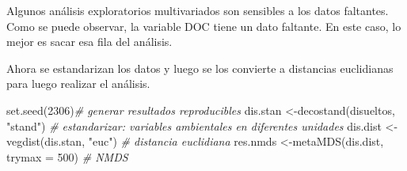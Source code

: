\documentclass[
]{book}
\newenvironment{Shaded}{\begin{snugshade}}{\end{snugshade}}
\newcommand{\AttributeTok}[1]{\textcolor[rgb]{0.77,0.63,0.00}{#1}}
\newcommand{\CommentTok}[1]{\textcolor[rgb]{0.56,0.35,0.01}{\textit{#1}}}
\newcommand{\DecValTok}[1]{\textcolor[rgb]{0.00,0.00,0.81}{#1}}
\newcommand{\DocumentationTok}[1]{\textcolor[rgb]{0.56,0.35,0.01}{\textbf{\textit{#1}}}}
\newcommand{\FunctionTok}[1]{\textcolor[rgb]{0.00,0.00,0.00}{#1}}
\newcommand{\NormalTok}[1]{#1}
\newcommand{\OtherTok}[1]{\textcolor[rgb]{0.56,0.35,0.01}{#1}}
\newcommand{\SpecialCharTok}[1]{\textcolor[rgb]{0.00,0.00,0.00}{#1}}
\newcommand{\StringTok}[1]{\textcolor[rgb]{0.31,0.60,0.02}{#1}}
\begin{document}
Algunos análisis exploratorios multivariados son sensibles a los datos faltantes. Como se puede observar, la variable DOC tiene un dato faltante. En este caso, lo mejor es sacar esa fila del análisis.

\begin{Shaded}
\end{Shaded}

Ahora se estandarizan los datos y luego se los convierte a distancias euclidianas para luego realizar el análisis.

\begin{Shaded}
\begin{Highlighting}[]
\FunctionTok{set.seed}\NormalTok{(}\DecValTok{2306}\NormalTok{)}\CommentTok{\# generar resultados reproducibles}
\NormalTok{dis.stan }\OtherTok{\textless{}{-}}\FunctionTok{decostand}\NormalTok{(disueltos, }\StringTok{"stand"}\NormalTok{) }\CommentTok{\# estandarizar: variables ambientales en diferentes unidades}
\NormalTok{dis.dist }\OtherTok{\textless{}{-}}\FunctionTok{vegdist}\NormalTok{(dis.stan, }\StringTok{"euc"}\NormalTok{) }\CommentTok{\# distancia euclidiana}
\NormalTok{res.nmds }\OtherTok{\textless{}{-}}\FunctionTok{metaMDS}\NormalTok{(dis.dist,  }\AttributeTok{trymax =} \DecValTok{500}\NormalTok{) }\CommentTok{\# NMDS}
\end{Highlighting}
\end{Shaded}
\end{document}
